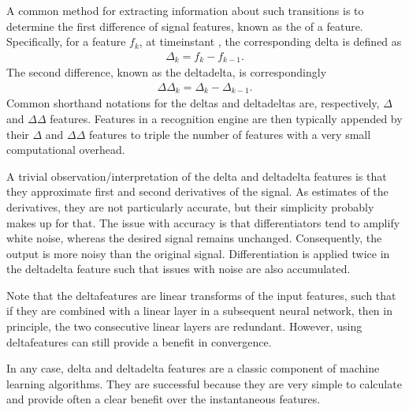 \documentclass[letterpaper,10pt,english]{jupyterBook}
\begin{document}
\sphinxAtStartPar
A common method for extracting information about such transitions is to
determine the first difference of signal features, known as the 
of a feature. Specifically, for a feature \(f_k\), at
time\sphinxhyphen{}instant , the corresponding delta is defined as
\begin{equation*}
\begin{split} \Delta_k = f_k - f_{k-1}. \end{split}
\end{equation*}
\sphinxAtStartPar
The second difference, known as the delta\sphinxhyphen{}delta, is correspondingly
\begin{equation*}
\begin{split} \Delta\Delta_k = \Delta_k - \Delta_{k-1}. \end{split}
\end{equation*}
\sphinxAtStartPar
Common short\sphinxhyphen{}hand notations for the deltas and delta\sphinxhyphen{}deltas are,
respectively, \( \Delta \) and \( \Delta\Delta \) \sphinxhyphen{}features.
Features in a recognition engine are then typically appended by their
\( \Delta \) and \( \Delta\Delta \) \sphinxhyphen{}features to triple the
number of features with a very small computational overhead.

\sphinxAtStartPar
A trivial observation/interpretation of the delta and delta\sphinxhyphen{}delta
features is that they approximate first and second derivatives of the
signal. As estimates of the derivatives, they are not particularly
accurate, but their simplicity probably makes up for that. The issue
with accuracy is that differentiators tend to amplify white noise,
whereas the desired signal remains unchanged. Consequently, the output
is more noisy than the original signal. Differentiation is applied twice
in the delta\sphinxhyphen{}delta feature such that issues with noise are also
accumulated.

\sphinxAtStartPar
Note that the delta\sphinxhyphen{}features are linear transforms of the input
features, such that if they are combined with a linear layer in a
subsequent neural network, then in principle, the two consecutive linear
layers are redundant. However, using delta\sphinxhyphen{}features can still provide a
benefit in convergence.

\sphinxAtStartPar
In any case, delta\sphinxhyphen{} and delta\sphinxhyphen{}delta features are a classic component of
machine learning algorithms. They are successful because they are very
simple to calculate and provide often a clear benefit over the
instantaneous features.
\end{document}
